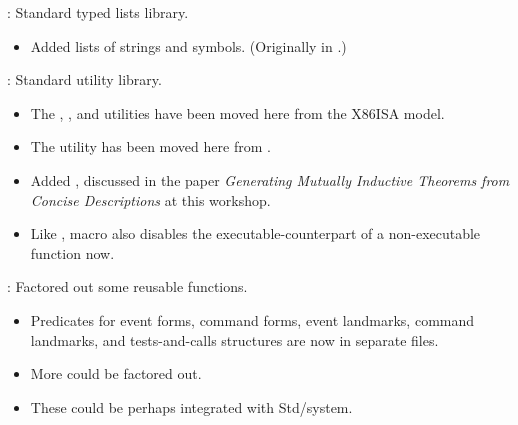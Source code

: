 
\begin{frame}

\implibtitle

:
Standard typed lists library.
\begin{itemize}
\item
Added lists of strings and symbols.
(Originally in .)
\end{itemize}

\separation

:
Standard utility library.
\begin{itemize}
\item
The
,
, and
utilities have been moved here from the X86ISA model.
\item
The  utility has been moved here
from .
\item Added , discussed in the paper \textit{Generating Mutually Inductive Theorems from Concise Descriptions} at this workshop.
\item
Like ,  macro also disables the executable-counterpart of a non-executable function now.
\end{itemize}

\end{frame}


\begin{frame}

\implibtitle

:
Factored out some reusable functions.
\begin{itemize}
\item
Predicates for
event forms,
command forms,
event landmarks,
command landmarks, and
tests-and-calls structures
are now in separate files.
\item
More could be factored out.
\item
These could be perhaps integrated with Std/system. 
\end{itemize}

\end{frame}

